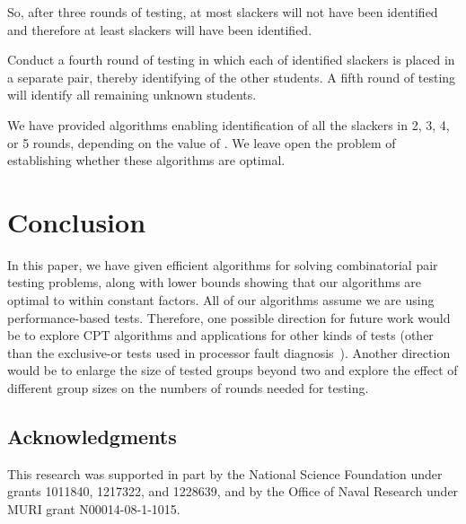 \documentclass[11pt]{llncs}
\let\realsubsection\subsection
\let\realsubsection\subsection
\renewcommand{\subsection}[1]{\paragraph{\bf #1.}}
\begin{document}
So, after three rounds of testing,
at most  slackers will not have been identified and therefore
at least  slackers
will have been identified.

Conduct a fourth round of testing in which each of  identified slackers is
placed in a separate pair, thereby identifying  of the other students.
A fifth round of testing will identify all remaining unknown students.

We have provided algorithms enabling identification of
all the slackers in 2, 3, 4, or 5 rounds, depending on the value of .
We leave open the problem of establishing whether these algorithms are optimal.
 \fi

\section{Conclusion}
In this paper, we have given efficient algorithms for solving combinatorial
pair testing problems, along with lower bounds showing that our algorithms
are optimal to within constant factors.
All of our algorithms assume we are using performance-based tests.
Therefore,
one possible direction for future work would be to explore CPT algorithms
and applications for other kinds of tests (other than the exclusive-or
tests used in 
processor fault 
diagnosis~\cite{bhk-95,Beigel:1989,Beigel:1993,Blecher1983107,Pelc:1998}). Another direction would be to enlarge the size of tested groups beyond two and explore the effect of different group sizes on the numbers of rounds needed for testing.

\realsubsection*{Acknowledgments} 
This research was supported in part by
the National Science Foundation under grants 1011840, 1217322, 
and 1228639, and by the Office of
Naval Research under MURI grant N00014-08-1-1015.

{\raggedright 
 
 
}

\clearpage
\end{document}
